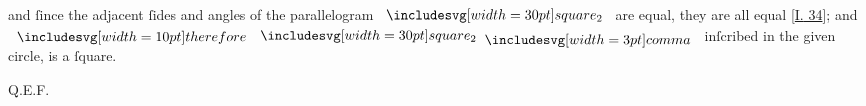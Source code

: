 \documentclass[12pt,preview]{standalone}
\begin{document}
\begin{minipage}[t]{0.64\textwidth}
    \hfill

    \hfill

    and ſince the adjacent ſides and angles of the parallelogram $\img[0][0][30]{square_2}$ are equal, they are all equal [\hyperref[book1pr34]{\textsc{I.} 34}]; and $\btherefore \img[0][0][30]{square_2} \bcomma$ inſcribed in the given circle, is a ſquare.

    \hfill

    \hfill Q.E.F.
\end{minipage}%
\hfill
\begin{minipage}[t]{0.33\textwidth}
    \vspace{40pt}
    
\end{minipage}%
\end{document}
